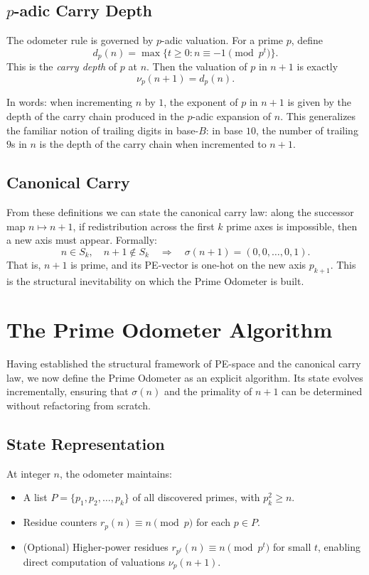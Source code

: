 \documentclass[12pt]{article}
\theoremstyle{definition}
\theoremstyle{remark}
\begin{document}
\subsection{$p$-adic Carry Depth}

The odometer rule is governed by $p$-adic valuation. For a prime $p$, define
\[
d_p(n) = \max \{ t \geq 0 : n \equiv -1 \pmod{p^t} \}.
\]
This is the \emph{carry depth} of $p$ at $n$. Then the valuation of $p$ in $n+1$ is exactly
\[
\nu_p(n+1) = d_p(n).
\]

In words: when incrementing $n$ by $1$, the exponent of $p$ in $n+1$ is given by the depth of the
carry chain produced in the $p$-adic expansion of $n$. This generalizes the familiar notion of
trailing digits in base-$B$: in base $10$, the number of trailing $9$s in $n$ is the depth of the
carry chain when incremented to $n+1$.

\subsection{Canonical Carry}

From these definitions we can state the canonical carry law: along the successor map $n \mapsto
n+1$, if redistribution across the first $k$ prime axes is impossible, then a new axis must appear.
Formally:
\[
n \in S_k, \quad n+1 \notin S_k \quad \Rightarrow \quad \sigma(n+1) = (0,0,\dots,0,1).
\]
That is, $n+1$ is prime, and its PE-vector is one-hot on the new axis $p_{k+1}$. This is the
structural inevitability on which the Prime Odometer is built.

\section{The Prime Odometer Algorithm}

Having established the structural framework of PE-space and the canonical carry law, we now
define the Prime Odometer as an explicit algorithm. Its state evolves incrementally, ensuring that
$\sigma(n)$ and the primality of $n+1$ can be determined without refactoring from scratch.

\subsection{State Representation}

At integer $n$, the odometer maintains:

\begin{itemize}
  \item A list $P = \{p_1, p_2, \dots, p_k\}$ of all discovered primes, with $p_k^2 \geq n$.
  \item Residue counters $r_p(n) \equiv n \pmod{p}$ for each $p \in P$.
  \item (Optional) Higher-power residues $r_{p^t}(n) \equiv n \pmod{p^t}$ for small $t$, enabling
        direct computation of valuations $\nu_p(n+1)$.
\end{itemize}
\end{document}
